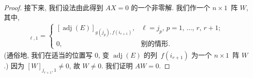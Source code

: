 \documentclass[../libro.tex]{subfiles}
\begin{document}
\begin{proof}
    接下来, 我们设法由此得到 \(AX = 0\)
    的一个非零解.
    我们作一个 \(n \times 1\)~阵 \(W\), 其中,
    \begin{align*}
        [W]_{\ell,1} =
        \begin{cases}
            [\operatorname{adj} {(E)}]_{g(j_p),f(i_{r+1})},
            & \text{\(\ell = j_p\),
            \(p = 1\), \(\dots\), \(r\), \(r+1\)}; \\
            0, & \text{别的情形}.
        \end{cases}
    \end{align*}
    (通俗地, 我们在适当的位置写 \(0\), %
    变 \(\operatorname{adj} {(E)}\)
    的列~\(f(i_{r+1})\)
    为一个 \(n \times 1\)~阵 \(W\).) %
    因为 \([W]_{j_{r+1},1} \neq 0\),
    故 \(W \neq 0\).
    我们证明 \(AW = 0\).


\end{proof}
\end{document}
